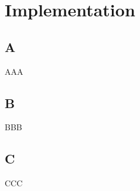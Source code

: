
%
%
%


\chapter{Implementation}
\label{ch:Implementation}

%




\section{A}

AAA


\section{B}

BBB


\section{C}

CCC
